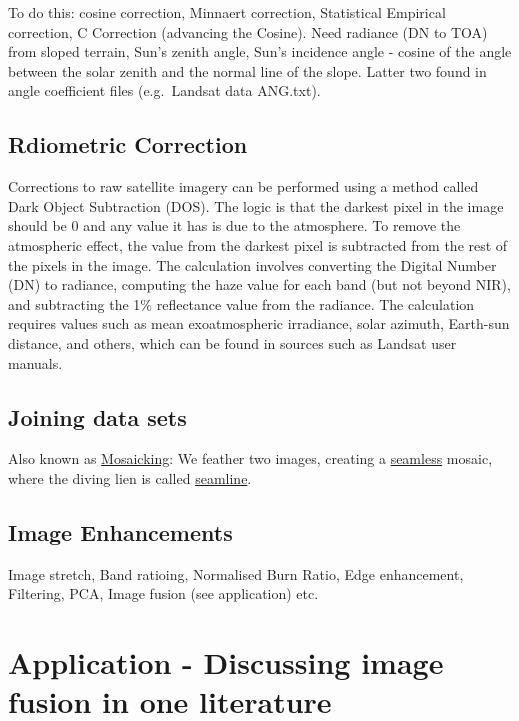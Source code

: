 \documentclass[
  letterpaper,
  DIV=11,
  numbers=noendperiod]{scrreprt}
\begin{document}
To do this: cosine correction, Minnaert correction, Statistical
Empirical correction, C Correction (advancing the Cosine). Need radiance
(DN to TOA) from sloped terrain, Sun's zenith angle, Sun's incidence
angle - cosine of the angle between the solar zenith and the normal line
of the slope. Latter two found in angle coefficient files (e.g.~Landsat
data ANG.txt).

\hypertarget{rdiometric-correction}{%
\subsection{Rdiometric Correction}\label{rdiometric-correction}}

Corrections to raw satellite imagery can be performed using a method
called Dark Object Subtraction (DOS). The logic is that the darkest
pixel in the image should be 0 and any value it has is due to the
atmosphere. To remove the atmospheric effect, the value from the darkest
pixel is subtracted from the rest of the pixels in the image. The
calculation involves converting the Digital Number (DN) to radiance,
computing the haze value for each band (but not beyond NIR), and
subtracting the 1\% reflectance value from the radiance. The calculation
requires values such as mean exoatmospheric irradiance, solar azimuth,
Earth-sun distance, and others, which can be found in sources such as
Landsat user manuals.

\hypertarget{joining-data-sets}{%
\subsection{Joining data sets}\label{joining-data-sets}}

Also known as \uline{Mosaicking}: We feather two images, creating a
\uline{seamless} mosaic, where the diving lien is called
\uline{seamline}.

\hypertarget{image-enhancements}{%
\subsection{Image Enhancements}\label{image-enhancements}}

Image stretch, Band ratioing, Normalised Burn Ratio, Edge enhancement,
Filtering, PCA, Image fusion (see application) etc.

\hypertarget{application---discussing-image-fusion-in-one-literature}{%
\section{Application - Discussing image fusion in one
literature}\label{application---discussing-image-fusion-in-one-literature}}
\end{document}
